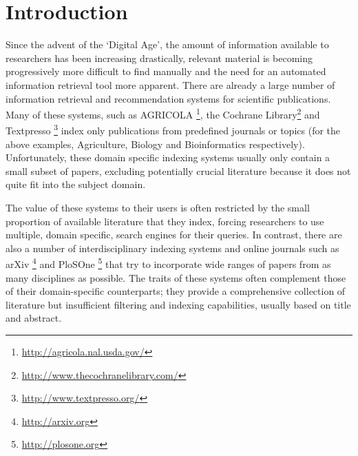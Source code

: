 \documentclass{svmult}
\begin{document}
\vspace{-15pt}
\section{Introduction} \label{sec:1}


Since the advent of the `Digital Age', the amount of information available to
researchers has been increasing drastically, relevant material is becoming
progressively more difficult to find manually and the need for an automated
information retrieval tool more apparent. There are already a large number of
information retrieval and recommendation systems for scientific publications.
Many of these systems, such as AGRICOLA \footnote{\url{http://agricola.nal.usda.gov/}},
the Cochrane Library\footnote{\url{http://www.thecochranelibrary.com/}} and Textpresso
\footnote{\url{http://www.textpresso.org/}} index only publications from predefined
journals or topics (for the above examples, Agriculture, Biology and
Bioinformatics respectively).  Unfortunately, these domain specific indexing
systems usually only contain a small subset of papers, excluding potentially
crucial literature because it does not quite fit into the subject domain. 

The value of these systems to their users is often restricted by the small
proportion of available literature that they index, forcing researchers to use
multiple, domain specific, search engines for their queries.  In contrast,
there are also a number of interdisciplinary indexing systems and online
journals such as arXiv \footnote{\url{http://arxiv.org}} and PloSOne
\footnote{\url{http://plosone.org}} that try to incorporate wide ranges of
papers from as many disciplines as possible. The traits of these systems often
complement those of their domain-specific counterparts; they provide a
comprehensive collection of literature but insufficient filtering and indexing
capabilities, usually based on title and abstract. 
\end{document}
